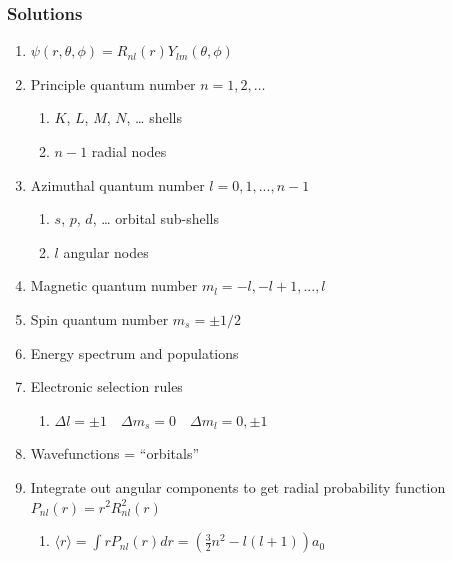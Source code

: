 \documentclass[11pt]{article}
\begin{document}
\subsubsection{Solutions}
\label{sec:orgea0fe26}
\begin{enumerate}
\item \(\psi(r,\theta,\phi)=R_{nl}(r)Y_{lm}(\theta,\phi)\)
\item Principle quantum number \(n=1,2,\ldots\)
\begin{enumerate}
\item \(K\), \(L\), \(M\), \(N\), \ldots{} shells
\item \(n-1\) radial nodes
\end{enumerate}
\item Azimuthal quantum number \(l=0,1,...,n-1\)
\begin{enumerate}
\item \(s\), \(p\), \(d\), \ldots{} orbital sub-shells
\item \(l\) angular nodes
\end{enumerate}
\item Magnetic quantum number \(m_l=-l,-l+1,...,l\)
\item Spin quantum number \(m_s=\pm 1/2\)
\item Energy spectrum and populations
\item Electronic selection rules
\begin{enumerate}
\item \(\Delta l=\pm 1 \quad \Delta m_s =0 \quad \Delta m_l = 0,\pm 1\)
\end{enumerate}
\item Wavefunctions = ``orbitals''
\item Integrate out angular components to get radial probability function \(P_{nl}(r)=r^2 R_{nl}^2(r)\)
\begin{enumerate}
\item \(\langle r\rangle = \int r P_{nl}(r) dr = \left(\frac{3}{2}n^2-l(l+1)\right)a_0\)
\end{enumerate}
\end{enumerate}
\end{document}

